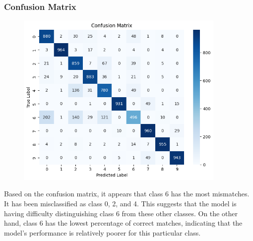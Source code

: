 \documentclass{midl} %
\begin{document}
\subsubsection{Confusion Matrix}
\begin{figure}[H]
\centering
\includegraphics[width=0.9\textwidth]{confusion_matrix_fashion.png}\hfill
\end{figure}
Based on the confusion matrix, it appears that class 6 has the most mismatches. It has been misclassified as class 0, 2, and 4. This suggests that the model is having difficulty distinguishing class 6 from these other classes. On the other hand, class 6 has the lowest percentage of correct matches, indicating that the model's performance is relatively poorer for this particular class.
\end{document}
